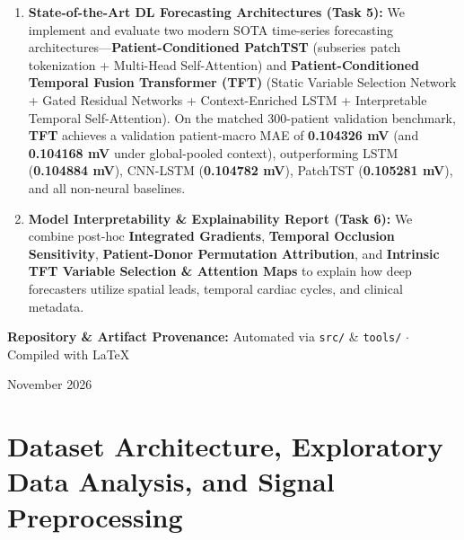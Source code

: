 \documentclass[11pt,a4paper]{article}
\begin{document}
\begin{titlepage}
\begin{minipage}{0.92\textwidth}
\begin{enumerate}
            \item \textbf{State-of-the-Art DL Forecasting Architectures (Task 5):} We implement and evaluate two modern SOTA time-series forecasting architectures---\textbf{Patient-Conditioned PatchTST} (subseries patch tokenization + Multi-Head Self-Attention) and \textbf{Patient-Conditioned Temporal Fusion Transformer (TFT)} (Static Variable Selection Network + Gated Residual Networks + Context-Enriched LSTM + Interpretable Temporal Self-Attention). On the matched 300-patient validation benchmark, \textbf{TFT} achieves a validation patient-macro MAE of \textbf{0.104326 mV} (and \textbf{0.104168 mV} under global-pooled context), outperforming LSTM (\textbf{0.104884 mV}), CNN-LSTM (\textbf{0.104782 mV}), PatchTST (\textbf{0.105281 mV}), and all non-neural baselines.
            \item \textbf{Model Interpretability \& Explainability Report (Task 6):} We combine post-hoc \textbf{Integrated Gradients}, \textbf{Temporal Occlusion Sensitivity}, \textbf{Patient-Donor Permutation Attribution}, and \textbf{Intrinsic TFT Variable Selection \& Attention Maps} to explain how deep forecasters utilize spatial leads, temporal cardiac cycles, and clinical metadata.
        \end{enumerate}
    \end{minipage}

    \vfill
    {\normalsize \textbf{Repository \& Artifact Provenance:} Automated via \texttt{src/} \& \texttt{tools/} $\cdot$ Compiled with \LaTeX\par}
    {\small November 2026\par}
\end{titlepage}

\tableofcontents
\newpage
\listoffigures
\listoftables
\newpage

\section{Dataset Architecture, Exploratory Data Analysis, and Signal Preprocessing}
\label{sec:eda_preprocessing}
\end{document}
